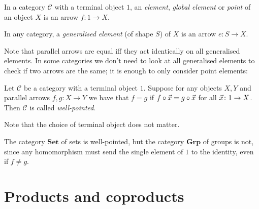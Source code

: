 \documentclass[article, a4paper, 11pt, oneside]{memoir}
\numberwithin{equation}{chapter}
\newcommand{\cat}[1]{\mathcal{#1}}
\newcommand{\ncat}[1]{\mathbf{#1}} %
\newcommand{\catSet}{\ncat{Set}}
\newcommand{\catGrp}{\ncat{Grp}}
\newcommand{\catC}{\cat{C}}
\begin{document}
\begin{definition}
    In a category $\catC$ with a terminal object $1$, an \emph{element}, \emph{global element} or \emph{point} of an object $X$ is an arrow $f \colon 1 \to X$.

    In any category, a \emph{generalised element} (of shape $S$) of $X$ is an arrow $e \colon S \to X$.
\end{definition}
%
Note that parallel arrows are equal iff they act identically on all generalised elements. In some categories we don't need to look at all generalised elements to check if two arrows are the same; it is enough to only consider point elements:

\begin{definition}
    Let $\catC$ be a category with a terminal object $1$. Suppose for any objects $X,Y$ and parallel arrows $f,g \colon X \to Y$ we have that $f = g$ if $f \circ \vec{x} = g \circ \vec{x}$ for all $\vec{x} \colon 1 \to X$. Then $\catC$ is called \emph{well-pointed}.
\end{definition}
%
Note that the choice of terminal object does not matter.


\begin{example}
    The category $\catSet$ of sets is well-pointed, but the category $\catGrp$ of groups is not, since any homomorphism must send the single element of $1$ to the identity, even if $f \neq g$.
\end{example}







\chapter{Products and coproducts}
\end{document}
